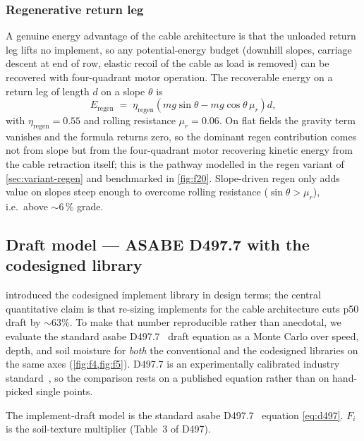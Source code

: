 \documentclass[11pt,a4paper]{article}
\begin{document}
\subsubsection{Regenerative return leg}\label{sec:regen}

A genuine energy advantage of the cable architecture is that the unloaded return leg lifts no implement, so any potential-energy budget (downhill slopes, carriage descent at end of row, elastic recoil of the cable as load is removed) can be recovered with four-quadrant motor operation. The recoverable energy on a return leg of length $d$ on a slope $\theta$ is
\begin{equation}\label{eq:regen}
E_{\text{regen}} \;=\; \eta_{\text{regen}}\!\left(m g \sin\theta - m g \cos\theta\,\mu_r\right) d,
\end{equation}
with $\eta_{\text{regen}} = 0.55$ and rolling resistance $\mu_r = 0.06$. On flat fields the gravity term vanishes and the formula returns zero, so the dominant regen contribution comes not from slope but from the four-quadrant motor recovering kinetic energy from the cable retraction itself; this is the pathway modelled in the regen variant of \cref{sec:variant-regen} and benchmarked in \cref{fig:f20}. Slope-driven regen only adds value on slopes steep enough to overcome rolling resistance ($\sin\theta > \mu_r$), i.e.\ above ${\sim}6\,\%$ grade.

\subsection{Draft model --- ASABE D497.7 with the codesigned library}\label{sec:soil}

 introduced the codesigned implement library in design terms; the central quantitative claim is that re-sizing implements for the cable architecture cuts \gls{p50} draft by ${\sim}\!63\%$. To make that number reproducible rather than anecdotal, we evaluate the standard \gls{asabe} D497.7~\cite{asabe-d497} draft equation as a Monte Carlo over speed, depth, and soil moisture for \emph{both} the conventional and the codesigned libraries on the same axes (\cref{fig:f4,fig:f5}). D497.7 is an experimentally calibrated industry standard~\cite{asabe-d497,kheiralla2004tillage}, so the comparison rests on a published equation rather than on hand-picked single points.

The implement-draft model is the standard \gls{asabe} D497.7~\cite{asabe-d497} equation \cref{eq:d497}. $F_{\!i}$ is the soil-texture multiplier (Table~3 of D497).
\end{document}
